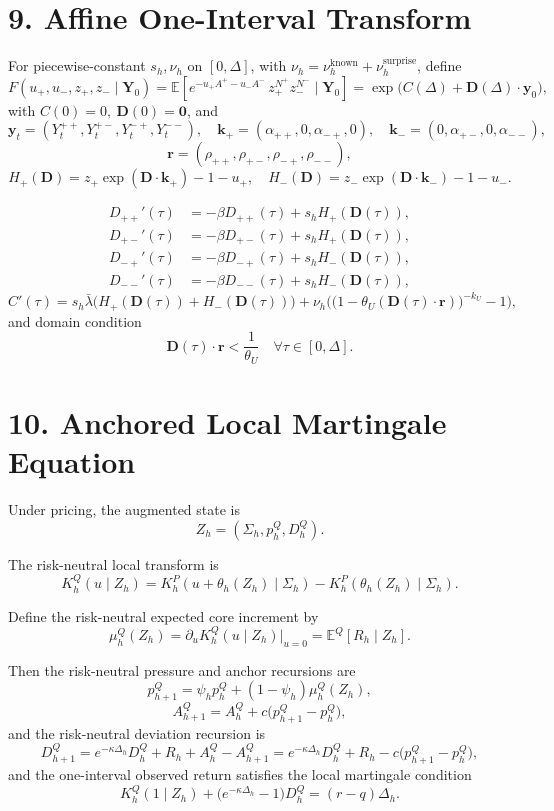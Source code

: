 \documentclass[11pt]{article}
\begin{document}
\section*{9. Affine One-Interval Transform}
For piecewise-constant \(s_h,\nu_h\) on \([0,\Delta]\), with \(\nu_h=\nu_h^{\mathrm{known}}+\nu_h^{\mathrm{surprise}}\), define
\[
F(u_+,u_-,z_+,z_-\mid \mathbf{Y}_0)
=
\mathbb{E}\!\left[
e^{-u_+A^+-u_-A^-}\,
z_+^{N^+}z_-^{N^-}
\mid \mathbf{Y}_0
\right]
=
\exp\!\big(C(\Delta)+\mathbf{D}(\Delta)\cdot\mathbf{y}_0\big),
\]
with \(C(0)=0,\ \mathbf{D}(0)=\mathbf{0}\), and
\[
\mathbf{y}_t=(Y_t^{++},Y_t^{+-},Y_t^{-+},Y_t^{--}),
\quad
\mathbf{k}_+=(\alpha_{++},0,\alpha_{-+},0),
\quad
\mathbf{k}_-=(0,\alpha_{+-},0,\alpha_{--}),
\]
\[
\mathbf{r}=(\rho_{++},\rho_{+-},\rho_{-+},\rho_{--}),
\]
\[
H_+(\mathbf{D})=z_+\exp(\mathbf{D}\cdot\mathbf{k}_+)-1-u_+,
\quad
H_-(\mathbf{D})=z_-\exp(\mathbf{D}\cdot\mathbf{k}_-)-1-u_-.
\]

\[
\begin{aligned}
D_{++}'(\tau) &= -\beta D_{++}(\tau) + s_h H_+(\mathbf{D}(\tau)),\\
D_{+-}'(\tau) &= -\beta D_{+-}(\tau) + s_h H_+(\mathbf{D}(\tau)),\\
D_{-+}'(\tau) &= -\beta D_{-+}(\tau) + s_h H_-(\mathbf{D}(\tau)),\\
D_{--}'(\tau) &= -\beta D_{--}(\tau) + s_h H_-(\mathbf{D}(\tau)),
\end{aligned}
\]
\[
C'(\tau)
=
s_h\bar{\lambda}\big(H_+(\mathbf{D}(\tau))+H_-(\mathbf{D}(\tau))\big)
+\nu_h\Big(\big(1-\theta_U(\mathbf{D}(\tau)\cdot\mathbf{r})\big)^{-k_U}-1\Big),
\]
and domain condition
\[
\mathbf{D}(\tau)\cdot\mathbf{r}<\frac{1}{\theta_U}\quad\forall\tau\in[0,\Delta].
\]

\section*{10. Anchored Local Martingale Equation}
Under pricing, the augmented state is
\[
Z_h=(\Sigma_h,p_h^Q,D_h^Q).
\]

The risk-neutral local transform is
\[
K_h^Q(u \mid Z_h)
=
K_h^P(u+\theta_h(Z_h)\mid \Sigma_h)-K_h^P(\theta_h(Z_h)\mid \Sigma_h).
\]

Define the risk-neutral expected core increment by
\[
\mu_h^Q(Z_h)
=
\partial_u K_h^Q(u \mid Z_h)\big|_{u=0}
=
\mathbb E^Q[R_h \mid Z_h].
\]

Then the risk-neutral pressure and anchor recursions are
\[
p_{h+1}^Q = \psi_h p_h^Q + (1-\psi_h)\mu_h^Q(Z_h),
\]
\[
A_{h+1}^Q = A_h^Q + c\big(p_{h+1}^Q - p_h^Q\big),
\]
and the risk-neutral deviation recursion is
\[
D_{h+1}^Q
=
e^{-\kappa \Delta_h} D_h^Q + R_h + A_h^Q - A_{h+1}^Q
=
e^{-\kappa \Delta_h} D_h^Q + R_h - c\big(p_{h+1}^Q - p_h^Q\big),
\]
and the one-interval observed return satisfies the local martingale condition
\[
K_h^Q(1 \mid Z_h)+\big(e^{-\kappa\Delta_h}-1\big)D_h^Q=(r-q)\Delta_h.
\]
\end{document}
